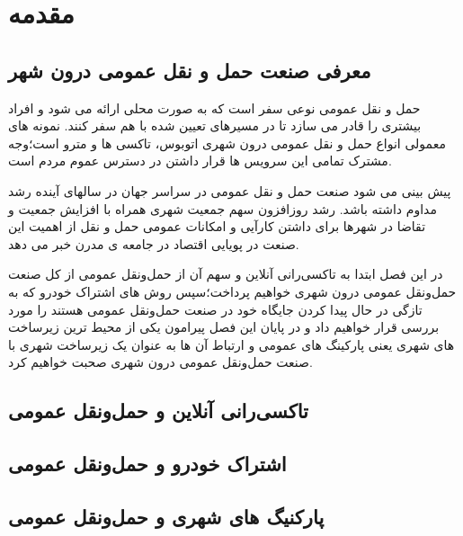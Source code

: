 \chapter{مقدمه}

\section{معرفی صنعت حمل و نقل عمومی درون شهر}
حمل و نقل عمومی نوعی سفر است که به صورت محلی ارائه می شود و افراد بیشتری را قادر می سازد تا در مسیرهای تعیین شده با هم سفر کنند. نمونه های معمولی انواع حمل و نقل عمومی درون شهری اتوبوس، تاکسی ها و مترو است؛‌وجه مشترک تمامی این سرویس ها قرار داشتن در دسترس عموم مردم است.

پیش بینی می شود صنعت حمل و نقل عمومی در سراسر جهان در سالهای آینده رشد مداوم داشته باشد. رشد روزافزون سهم جمعیت شهری همراه با افزایش جمعیت و تقاضا در شهرها برای داشتن کارآیی و امکانات عمومی حمل و نقل از اهمیت این صنعت در پویایی اقتصاد در جامعه ی مدرن خبر می دهد.

در این فصل ابتدا به تاکسی‌رانی آنلاین و سهم آن از حمل‌و‌نقل عمومی از کل صنعت حمل‌و‌نقل عمومی درون شهری خواهیم پرداخت؛سپس روش های اشتراک خودرو که به تازگی در حال پیدا کردن جایگاه خود در صنعت حمل‌و‌نقل عمومی هستند را مورد بررسی قرار خواهیم داد و در پایان این فصل پیرامون یکی از محیط ترین زیرساخت های شهری یعنی پارکینگ های عمومی و ارتباط آن ها به عنوان یک زیرساخت شهری با صنعت حمل‌و‌نقل عمومی درون شهری صحبت خواهیم کرد.
\section{تاکسی‌رانی آنلاین و حمل‌و‌نقل عمومی}

\section{اشتراک خودرو و حمل‌و‌نقل عمومی}

\section{پارکنیگ های شهری و حمل‌و‌نقل عمومی}